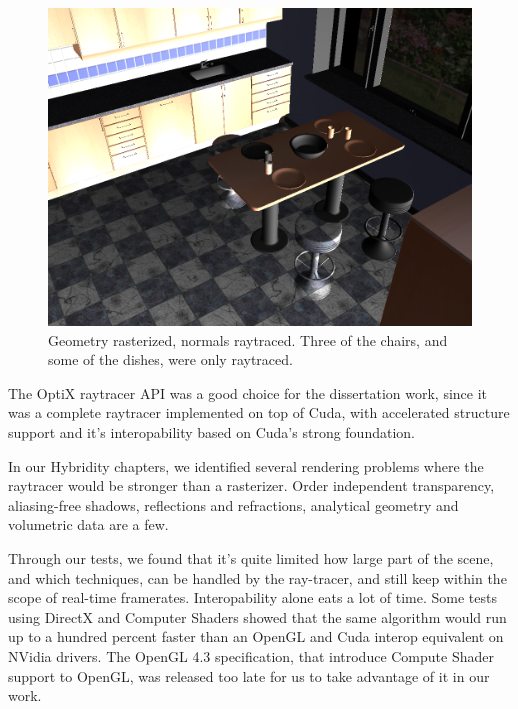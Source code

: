 \begin{figure}[H]
	\centering
	\includegraphics[width=1.00\textwidth]{Media/hybrid.png}
	\caption{Geometry rasterized, normals raytraced. Three of the chairs, and some of the dishes, were only raytraced.}
	\label{fig:hybrid_image01}
\end{figure}

The OptiX raytracer API was a good choice for the dissertation work, since it was a complete raytracer implemented on top of Cuda, with accelerated structure support and it's interopability based on Cuda's strong foundation.

In our Hybridity chapters, we identified several rendering problems where the raytracer would be stronger than a rasterizer. Order independent transparency, aliasing-free shadows, reflections and refractions, analytical geometry and volumetric data are a few.

Through our tests, we found that it's quite limited how large part of the scene, and which techniques, can be handled by the ray-tracer, and still keep within the scope of real-time framerates. Interopability alone eats a lot of time. Some tests using DirectX and Computer Shaders showed that the same algorithm would run up to a hundred percent faster than an OpenGL and Cuda interop equivalent on NVidia drivers. The OpenGL 4.3 specification, that introduce Compute Shader support to OpenGL, was released too late for us to take advantage of it in our work.

